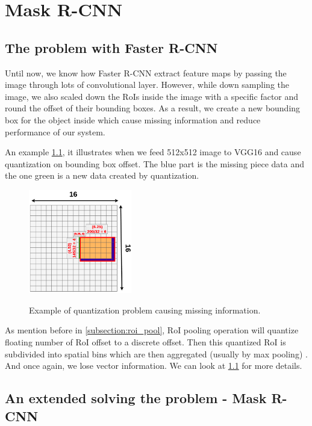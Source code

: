 \chapter{Mask R-CNN}
\noindent

\section{The problem with Faster R-CNN}
\label{section:problemofFasterRCNN}
\noindent

	Until now, we know how Faster R-CNN extract feature maps by passing the image through lots of convolutional layer. However, while down sampling the image, we also scaled down the RoIs inside the image with a specific factor and round the offset of their bounding boxes. As a result, we create a new bounding box for the object inside which cause missing information and reduce performance of our system.
	
	An example \ref{fig:quantization_problem}, it illustrates when we feed 512x512 image to VGG16 and cause quantization on bounding box offset. The blue part is the missing piece data and the one green is a new data created by quantization.
	
	\begin{figure}[H]
		\centering
		{\includegraphics[width=0.4\textwidth]{./hinhanh/chap5/problem.png}}
		\caption{Example of quantization problem causing missing information.}
		\label{fig:quantization_problem}
	\end{figure}
	
	As mention before in \ref{subsection:roi_pool}, RoI pooling operation will quantize floating number of RoI offset to a discrete offset. Then this quantized RoI is subdivided into spatial bins which are then aggregated (usually by max pooling) \cite{fasterrcnn}. And once again, we lose vector information. We can look at \ref{fig:quantization_problem} for more details.

\section{An extended solving the problem - Mask R-CNN}
\label{section:maskrcnn}
\noindent

